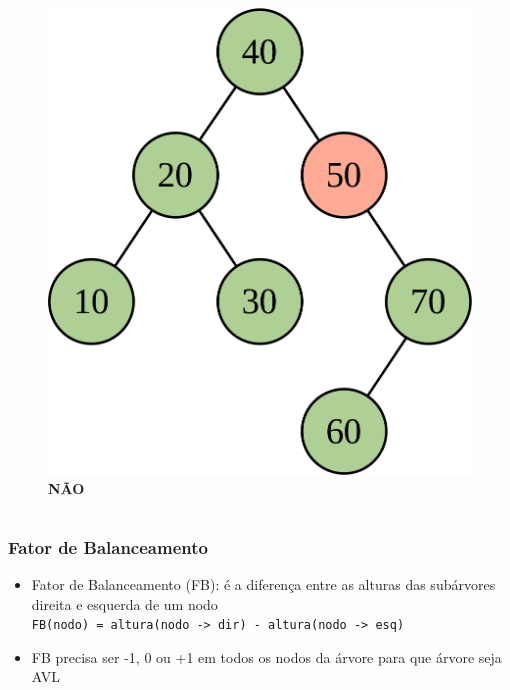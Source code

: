 \documentclass[aspectratio=169]{beamer}
\begin{document}
\begin{frame}
\begin{columns}[T]
\begin{column}{0.5\linewidth}
\begin{figure}[h]
	\includegraphics[height=0.5\paperheight]{imagens/avl03b.png}\\
	\textbf{NÃO}
\end{figure}
\end{column}
\end{columns}
\end{frame}

\begin{frame}\frametitle{Fator de Balanceamento}
\begin{itemize}
	\item Fator de Balanceamento (FB): é a diferença entre as alturas das subárvores direita e esquerda de um nodo\\
\texttt{FB(nodo) = altura(nodo -> dir) - altura(nodo -> esq)}
	\item FB precisa ser -1, 0 ou +1 em todos os nodos da árvore para que árvore seja AVL
\end{itemize}
\end{frame}
\end{document}
